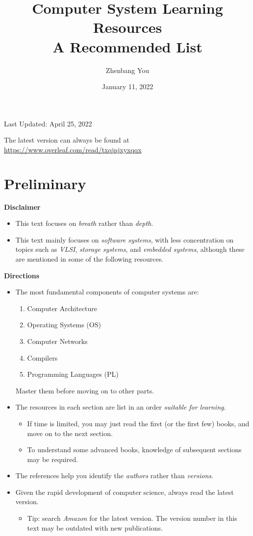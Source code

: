 \documentclass{article}
\title{\Huge{Computer System Learning Resources}\\ \huge{A Recommended List}}
\author{Zhenbang You}
\date{January 11, 2022}
\begin{document}
\maketitle

\centerline{\large{Last Updated: April 25, 2022}}

\vspace{20pt}

The latest version can always be found at \href{https://www.overleaf.com/read/txqjnjxyxqqx
}{https://www.overleaf.com/read/txqjnjxyxqqx
}

\section{Preliminary}

\textbf{Disclaimer}
\begin{itemize}
    \item This text focuses on \emph{breath} rather than \emph{depth}.
    \item This text mainly focuses on \emph{software systems}, with less concentration on topics such as \emph{VLSI}, \emph{storage systems}, and \emph{embedded systems}, although these are mentioned in some of the following resources.
\end{itemize}

\noindent
\textbf{Directions}
\begin{itemize}
    \item The most fundamental components of computer systems are:
    \begin{enumerate}
        \item Computer Architecture
        \item Operating Systems (OS)
        \item Computer Networks
        \item Compilers
        \item Programming Languages (PL)
    \end{enumerate}
    Master them before moving on to other parts.
    \item The resources in each section are list in an order \emph{suitable for learning}.
    \begin{itemize}
        \item If time is limited, you may just read the first (or the first few) books, and move on to the next section.
        \item To understand some advanced books, knowledge of subsequent sections may be required.
    \end{itemize}
    \item The references help you identify the \emph{authors} rather than \emph{versions}.
    \item Given the rapid development of computer science, always read the latest version.
    \begin{itemize}
        \item Tip: search \emph{Amazon} for the latest version. The version number in this text may be outdated with new publications.
    \end{itemize}
\end{itemize}
\end{document}
